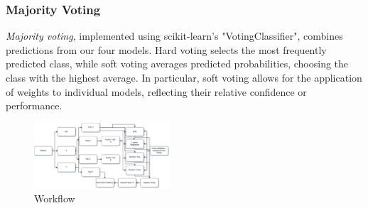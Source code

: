 \subsubsection{Majority Voting}
\textit{Majority voting}, implemented using scikit-learn's "VotingClassifier", combines predictions from our four models. Hard voting selects the most frequently predicted class, while soft voting averages predicted probabilities, choosing the class with the highest average. In particular, soft voting allows for the application of weights to individual models, reflecting their relative confidence or performance.
\begin{figure}[ht!]
    \centering
    \includegraphics[width = 0.45\textwidth]{./images/workflow.png}
    \caption{Workflow}
    \label{fig:2}
\end{figure}